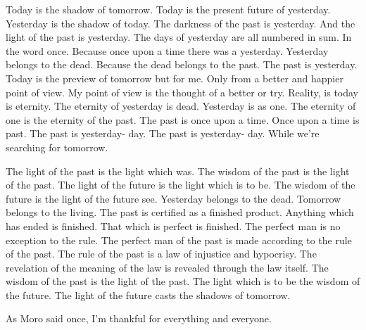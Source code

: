 \documentclass[12pt, %
               openright, %
               oneside, %
               a4paper, %
               chapter=TITLE, %
               section=TITLE, %
               brazil,
               english %
]{abntex2}
\begin{document}
\begin{agradecimentos}
  Today is the shadow of tomorrow. Today is the present future of
  yesterday. Yesterday is the shadow of today. The darkness of the past
  is yesterday. And the light of the past is yesterday. The days of
  yesterday are all numbered in sum. In the word once. Because once upon
  a time there was a yesterday. Yesterday belongs to the dead.  Because
  the dead belongs to the past. The past is yesterday. Today is the
  preview of tomorrow but for me. Only from a better and happier point
  of view. My point of view is the thought of a better or try.  Reality,
  is today is eternity. The eternity of yesterday is dead.  Yesterday is
  as one. The eternity of one is the eternity of the past.  The past is
  once upon a time. Once upon a time is past. The past is yesterday-
  day. The past is yesterday- day. While we're searching for tomorrow.

  The light of the past is the light which was. The wisdom of the past
  is the light of the past. The light of the future is the light which
  is to be. The wisdom of the future is the light of the future see.
  Yesterday belongs to the dead. Tomorrow belongs to the living. The
  past is certified as a finished product. Anything which has ended is
  finished. That which is perfect is finished. The perfect man is no
  exception to the rule. The perfect man of the past is made according
  to the rule of the past. The rule of the past is a law of injustice
  and hypocrisy. The revelation of the meaning of the law is revealed
  through the law itself. The wisdom of the past is the light of the
  past. The light which is to be the wisdom of the future. The light of
  the future casts the shadows of tomorrow.

  As Moro said once, I'm thankful for everything and everyone.
\end{agradecimentos}
\end{document}
